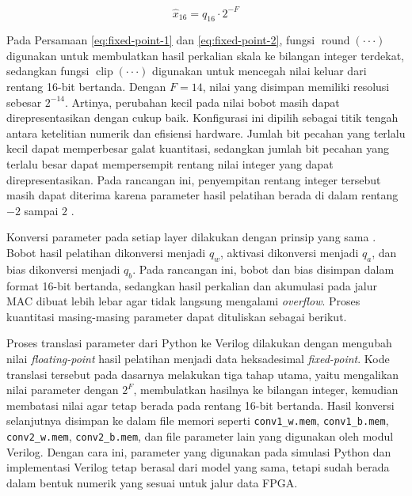 	\begin{equation}
	\hat{x}_{16} = q_{16} \cdot 2^{-F}
	\label{eq:fixed-point-2}
	\end{equation}

	Pada Persamaan \ref{eq:fixed-point-1} dan \ref{eq:fixed-point-2}, fungsi
	$\operatorname{round}(\cdot\cdot\cdot)$ digunakan untuk membulatkan hasil perkalian skala ke
	bilangan integer terdekat, sedangkan fungsi $\operatorname{clip}(\cdot\cdot\cdot)$ digunakan
	untuk mencegah nilai keluar dari rentang 16-bit bertanda. Dengan $F=14$, nilai
	yang disimpan memiliki resolusi sebesar $2^{-14}$. Artinya, perubahan kecil pada
	nilai bobot masih dapat direpresentasikan dengan cukup baik. Konfigurasi ini
	dipilih sebagai titik tengah antara ketelitian numerik dan efisiensi hardware.
	Jumlah bit pecahan yang terlalu kecil dapat memperbesar galat kuantitasi,
	sedangkan jumlah bit pecahan yang terlalu besar dapat mempersempit rentang nilai
	integer yang dapat direpresentasikan. Pada rancangan ini, penyempitan rentang
	integer tersebut masih dapat diterima karena parameter hasil pelatihan berada
	di dalam rentang $-2$ sampai $2$ \cite{Lin2016FixedPointQuantization}.

	Konversi parameter pada setiap layer dilakukan dengan prinsip yang sama \cite{Gupta2015LimitedPrecision}. Bobot
	hasil pelatihan dikonversi menjadi $q_w$, aktivasi dikonversi menjadi $q_a$, dan
	bias dikonversi menjadi $q_b$. Pada rancangan ini, bobot dan bias disimpan dalam
	format 16-bit bertanda, sedangkan hasil perkalian dan akumulasi pada jalur MAC
	dibuat lebih lebar agar tidak langsung mengalami \emph{overflow}. Proses
	kuantitasi masing-masing parameter dapat dituliskan sebagai berikut.

	Proses translasi parameter dari Python ke Verilog dilakukan dengan mengubah nilai
	\emph{floating-point} hasil pelatihan menjadi data heksadesimal \emph{fixed-point}.
	Kode translasi tersebut pada dasarnya melakukan tiga tahap utama, yaitu mengalikan
	nilai parameter dengan $2^F$, membulatkan hasilnya ke bilangan integer, kemudian
	membatasi nilai agar tetap berada pada rentang 16-bit bertanda. Hasil konversi
	selanjutnya disimpan ke dalam file memori seperti \texttt{conv1\_w.mem},
	\texttt{conv1\_b.mem}, \texttt{conv2\_w.mem}, \texttt{conv2\_b.mem}, dan file
	parameter lain yang digunakan oleh modul Verilog. Dengan cara ini, parameter yang
	digunakan pada simulasi Python dan implementasi Verilog tetap berasal dari model
	yang sama, tetapi sudah berada dalam bentuk numerik yang sesuai untuk jalur data
	FPGA.

